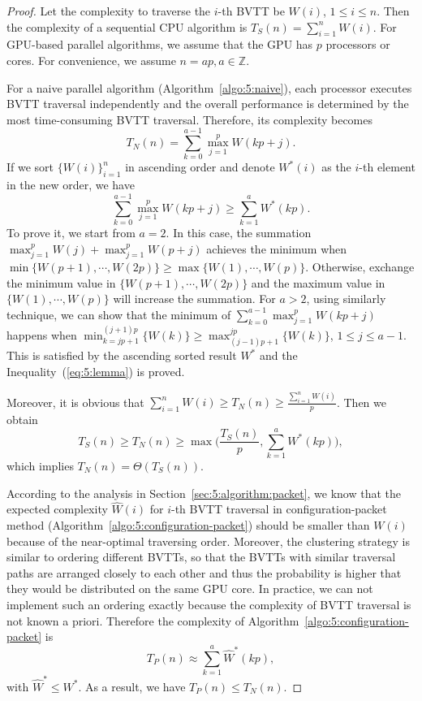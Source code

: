 \begin{proof}
Let the complexity to traverse the $i$-th BVTT be $W(i)$, $1\leq i\leq n$. Then the complexity of a
sequential CPU algorithm is $T_S(n) = \sum_{i=1}^n W(i)$. For GPU-based parallel algorithms, we assume that the
GPU has $p$ processors or cores. For convenience, we assume $n = ap, a \in \mathbb{Z}$.

For a naive parallel algorithm (Algorithm~\ref{algo:5:naive}), each processor executes BVTT traversal independently and the overall performance is determined by the most time-consuming BVTT traversal. Therefore, its complexity becomes
$$T_N(n) = \sum_{k=0}^{a-1} \max_{j=1}^p W(kp + j).$$
If we sort $\{W(i)\}_{i=1}^n$ in ascending order and denote $W^*(i)$ as the $i$-th element in the new order, we have
\begin{equation}
\label{eq:5:lemma}
\sum_{k=0}^{a-1} \max_{j=1}^p W(kp + j) \geq \sum_{k=1}^{a}W^*(kp).
\end{equation}
To prove it, we start from $a=2$. In this case, the summation $\max_{j=1}^p W(j) + \max_{j=1}^p W(p + j)$ achieves the minimum when $\min{\{W(p+1), \cdots, W(2p)\}} \geq \max{\{W(1), \cdots, W(p)\}}$. Otherwise, exchange the minimum value in $\{W(p+1), \cdots, W(2p)\}$ and the maximum value in $\{W(1), \cdots, W(p)\}$ will increase the summation. For $a>2$, using similarly technique, we can show that the minimum of $\sum_{k=0}^{a-1} \max_{j=1}^p W(kp + j)$ happens when $\min_{k=jp+1}^{(j+1)p}{\{W(k)\}} \geq \max_{(j-1)p+1}^{jp}{\{W(k)\}}$, $1 \leq j \leq a - 1$. This is satisfied by the ascending sorted result $W^*$ and the Inequality~(\ref{eq:5:lemma}) is proved.

Moreover, it is obvious that $\sum_{i=1}^n W(i) \geq T_N(n) \geq \frac{\sum_{i=1}^n W(i)}{p}$. Then we obtain
$$T_S(n) \geq T_N(n) \geq \max\big(\frac{T_S(n)}{p}, \sum_{k=1}^{a}W^*(kp)\big),$$
which implies $T_N(n) = \Theta(T_S(n))$.

According to the analysis in Section~\ref{sec:5:algorithm:packet}, we know that the expected complexity $\hat{W}(i)$ for $i$-th BVTT traversal in configuration-packet method (Algorithm~\ref{algo:5:configuration-packet}) should be smaller than $W(i)$ because of the near-optimal traversing order. Moreover, the clustering strategy is similar to ordering different BVTTs, so that the BVTTs with similar traversal paths are arranged closely to each other and thus the probability is higher that they would be distributed on the same GPU core. In practice, we can not implement such an ordering exactly
because the complexity of BVTT traversal is not known a priori. Therefore the complexity of Algorithm~\ref{algo:5:configuration-packet} is $$T_P(n) \approx \sum_{k=1}^a \hat{W}^*(kp),$$ with $\hat{W}^* \leq W^*$. As a result, we have $T_P(n) \leq T_N(n)$.


\end{proof}
